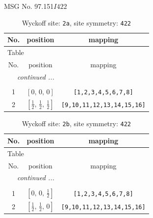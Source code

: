 \documentclass[fleqn,8pt]{jsarticle}
\begin{document}
\setcounter{MaxMatrixCols}{32}

\renewcommand{\tablename}{Table~}
\renewcommand{\figurename}{Figure~}
\begin{center}
\LARGE
MSG No. 97.151\quad$I422$
\end{center}
\renewcommand{\arraystretch}{1.2}
\begin{longtable}{ccc}
\caption{Wyckoff site: {\tt 2a}, site symmetry: {\tt 422}}
 \\
 \hline \hline
No. & position & mapping \\ \hline \endfirsthead

\multicolumn{2}{l}{\tablename\ \thetable{}} \\
 \hline \hline
No. & position & mapping \\ \hline \endhead

 \hline \hline
\multicolumn{2}{r}{\footnotesize\it continued ...} \\ \endfoot

 \hline \hline
\multicolumn{2}{r}{} \\ \endlastfoot

1 & $\left[ 0,\, 0,\, 0 \right]$ & {\tt [1,2,3,4,5,6,7,8]} \\ \hline
2 & $\left[ \frac{1}{2},\, \frac{1}{2},\, \frac{1}{2} \right]$ & {\tt [9,10,11,12,13,14,15,16]} \\
\end{longtable}
\renewcommand{\arraystretch}{1.2}
\begin{longtable}{ccc}
\caption{Wyckoff site: {\tt 2b}, site symmetry: {\tt 422}}
 \\
 \hline \hline
No. & position & mapping \\ \hline \endfirsthead

\multicolumn{2}{l}{\tablename\ \thetable{}} \\
 \hline \hline
No. & position & mapping \\ \hline \endhead

 \hline \hline
\multicolumn{2}{r}{\footnotesize\it continued ...} \\ \endfoot

 \hline \hline
\multicolumn{2}{r}{} \\ \endlastfoot

1 & $\left[ 0,\, 0,\, \frac{1}{2} \right]$ & {\tt [1,2,3,4,5,6,7,8]} \\ \hline
2 & $\left[ \frac{1}{2},\, \frac{1}{2},\, 0 \right]$ & {\tt [9,10,11,12,13,14,15,16]} \\
\end{longtable}
\end{document}
